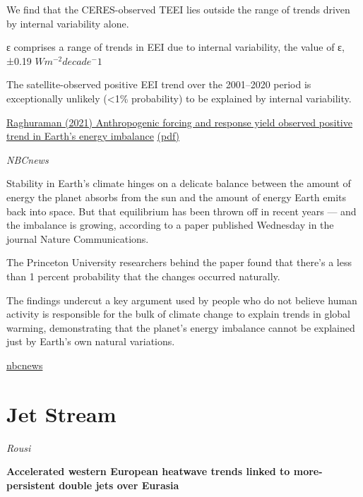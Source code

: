 \documentclass[
]{book}
\begin{document}
We find that the CERES-observed TEEI lies outside the range
of trends driven by internal variability alone.

ε comprises a range of trends in EEI due to internal
variability, the value of ε, ±0.19 \(Wm^{-2} decade^−1\)

The satellite-observed positive EEI trend over the 2001--2020
period is exceptionally unlikely (\textless1\% probability) to be
explained by internal variability.

\href{https://www.nature.com/articles/s41467-021-24544-4}{Raghuraman (2021) Anthropogenic forcing and response yield observed positive trend in Earth's energy imbalance}
\href{pdf/Raghuraman_2021_TEEI.pdf}{(pdf)}

\emph{NBCnews}

Stability in Earth's climate hinges on a delicate balance between the amount of energy the planet absorbs from the sun and the amount of energy Earth emits back into space. But that equilibrium has been thrown off in recent years --- and the imbalance is growing, according to a paper published Wednesday in the journal Nature Communications.

The Princeton University researchers behind the paper found that there's a less than 1 percent probability that the changes occurred naturally.

The findings undercut a key argument used by people who do not believe human activity is responsible for the bulk of climate change to explain trends in global warming, demonstrating that the planet's energy imbalance cannot be explained just by Earth's own natural variations.

\href{https://www.nbcnews.com/science/environment/earths-energy-imbalance-removes-almost-doubt-human-made-climate-change-rcna1562}{nbcnews}

\hypertarget{jet-stream}{%
\chapter{Jet Stream}\label{jet-stream}}

\emph{Rousi}

\textbf{Accelerated western European heatwave trends linked to more-persistent double jets over Eurasia}
\end{document}
